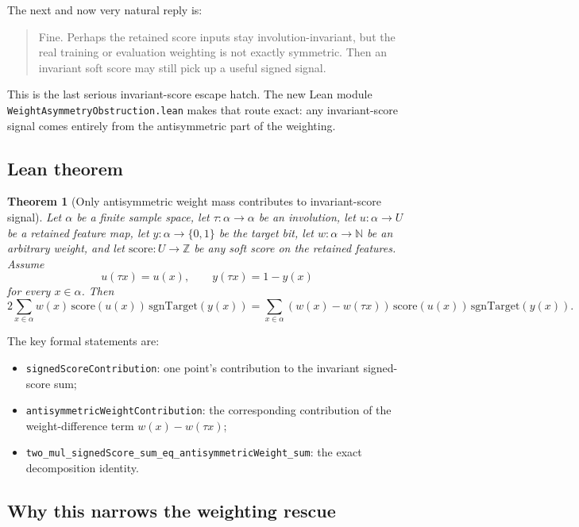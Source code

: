 \documentclass[11pt]{article}
\newtheorem{theorem}{Theorem}[section]
\theoremstyle{remark}
\begin{document}
The next and now very natural reply is:
\begin{quote}
Fine.  Perhaps the retained score inputs stay involution-invariant, but the real training or
evaluation weighting is not exactly symmetric.  Then an invariant soft score may still pick up a
useful signed signal.
\end{quote}

This is the last serious invariant-score escape hatch.  The new Lean module
\texttt{WeightAsymmetryObstruction.lean} makes that route exact: any invariant-score signal comes
entirely from the antisymmetric part of the weighting.

\subsection{Lean theorem}

\begin{theorem}[Only antisymmetric weight mass contributes to invariant-score signal]
Let \(\alpha\) be a finite sample space, let \(\tau : \alpha \to \alpha\) be an involution, let
\(u : \alpha \to U\) be a retained feature map, let \(y : \alpha \to \{0,1\}\) be the target bit,
let \(w : \alpha \to \mathbb{N}\) be an arbitrary weight, and let
\(\mathrm{score} : U \to \mathbb{Z}\) be any soft score on the retained features.  Assume
\[
  u(\tau x) = u(x), \qquad y(\tau x) = 1-y(x)
\]
for every \(x \in \alpha\).  Then
\[
  2 \sum_{x \in \alpha} w(x)\,\mathrm{score}(u(x))\,\mathrm{sgnTarget}(y(x))
  =
  \sum_{x \in \alpha} (w(x)-w(\tau x))\,\mathrm{score}(u(x))\,\mathrm{sgnTarget}(y(x)).
\]
\end{theorem}

\noindent
The key formal statements are:
\begin{itemize}[leftmargin=1.5em]
  \item \texttt{signedScoreContribution}: one point's contribution to the invariant signed-score
  sum;
  \item \texttt{antisymmetricWeightContribution}: the corresponding contribution of the
  weight-difference term \(w(x)-w(\tau x)\);
  \item \texttt{two\_mul\_signedScore\_sum\_eq\_antisymmetricWeight\_sum}: the exact decomposition
  identity.
\end{itemize}

\subsection{Why this narrows the weighting rescue}
\end{document}
